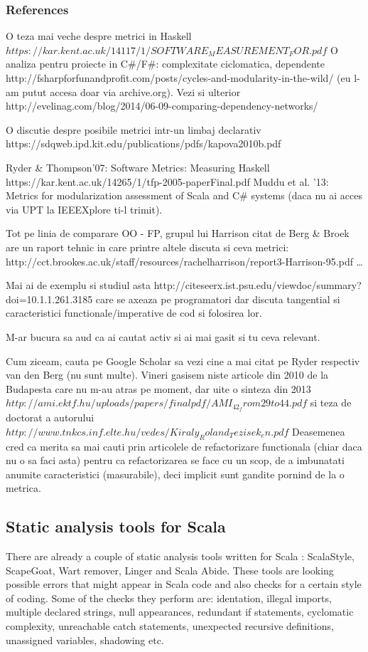 \documentclass{article}
\begin{document}
\subsubsection {References}

O teza mai veche despre metrici in Haskell
        $https://kar.kent.ac.uk/14117/1/SOFTWARE_MEASUREMENT_FOR.pdf$
O analiza pentru proiecte in C\#/F\#: complexitate ciclomatica, dependente
        http://fsharpforfunandprofit.com/posts/cycles-and-modularity-in-the-wild/
(eu l-am putut accesa doar via archive.org). Vezi si ulterior
        http://evelinag.com/blog/2014/06-09-comparing-dependency-networks/

O discutie despre posibile metrici intr-un limbaj declarativ
        https://sdqweb.ipd.kit.edu/publications/pdfs/kapova2010b.pdf

Ryder \& Thompson'07: Software Metrics: Measuring Haskell https://kar.kent.ac.uk/14265/1/tfp-2005-paperFinal.pdf
Muddu et al. '13: Metrics for modularization assessment of Scala and C\# systems
(daca nu ai acces via UPT la IEEEXplore ti-l trimit).

Tot pe linia de comparare OO - FP, grupul lui Harrison citat de
Berg \& Broek are un raport tehnic in care printre altele discuta
si ceva metrici:
        http://cct.brookes.ac.uk/staff/resources/rachelharrison/report3-Harrison-95.pdf
…

Mai ai de exemplu si studiul asta
        http://citeseerx.ist.psu.edu/viewdoc/summary?doi=10.1.1.261.3185
care se axeaza pe programatori dar discuta tangential si caracteristici
functionale/imperative de cod si folosirea lor.

M-ar bucura sa aud ca ai cautat activ si ai mai gasit si tu ceva relevant.


Cum ziceam, cauta pe Google Scholar sa vezi cine a mai citat pe
Ryder respectiv van den Berg (nu sunt multe). Vineri gasisem niste
articole din 2010 de la Budapesta care nu m-au atras pe moment,
dar uite o sinteza din 2013
        $http://ami.ektf.hu/uploads/papers/finalpdf/AMI_42_from29to44.pdf$
si teza de doctorat a autorului
$        http://www.tnkcs.inf.elte.hu/vedes/Kiraly_Roland_Tezisek_en.pdf$
Deasemenea cred ca merita sa mai cauti prin articolele de refactorizare
functionala (chiar daca nu o sa faci asta) pentru ca refactorizarea
se face cu un scop, de a imbunatati anumite caracteristici (masurabile),
deci implicit sunt gandite pornind de la o metrica.

\subsection {Static analysis tools for Scala}
There are already a couple of static analysis tools written for Scala : ScalaStyle, ScapeGoat, Wart remover, Linger and Scala Abide. These tools are looking possible errors that might appear in Scala code and also checks for a certain style of coding. Some of the checks they perform are: identation, illegal imports, multiple declared strings, null appearances, redundant if statements, cyclomatic complexity, unreachable catch statements, unexpected recursive definitions, unassigned variables, shadowing etc. \par
\end{document}
